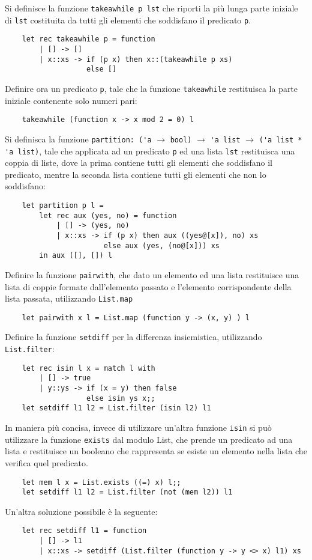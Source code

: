 \documentclass{article}
\numberwithin{equation}{subsection}
\begin{document}
Si definisce la funzione \verb|takeawhile p lst| che riporti la più lunga parte iniziale di \verb|lst| costituita da tutti gli elementi che soddisfano il predicato \verb|p|. 
\begin{verbatim}
    let rec takeawhile p = function
        | [] -> []
        | x::xs -> if (p x) then x::(takeawhile p xs)
                   else []
\end{verbatim}
Definire ora un predicato \verb|p|, tale che la funzione \verb|takeawhile| restituisca la parte iniziale contenente solo numeri pari:
\begin{verbatim}
    takeawhile (function x -> x mod 2 = 0) l    
\end{verbatim}

Si definisca la funzione \verb|partition: ('a| $\rightarrow$ \verb|bool)| $\rightarrow$ \verb|'a list| $\rightarrow$ \verb|('a list * 'a list)|, tale che applicata ad un predicato \verb|p| ed una lista \verb|lst| restituisca una coppia di liste, dove la prima contiene tutti gli elementi che soddisfano il predicato, mentre la seconda lista contiene tutti gli elementi che non lo soddisfano:
\begin{verbatim}
    let partition p l =
        let rec aux (yes, no) = function
            | [] -> (yes, no)
            | x::xs -> if (p x) then aux ((yes@[x]), no) xs
                       else aux (yes, (no@[x])) xs
        in aux ([], []) l    
\end{verbatim}

Definire la funzione \verb|pairwith|, che dato un elemento ed una lista restituisce una lista di coppie formate dall'elemento passato e l'elemento corrispondente della lista passata, utilizzando \verb|List.map|
\begin{verbatim}
    let pairwith x l = List.map (function y -> (x, y) ) l
\end{verbatim}

Definire la funzione \verb|setdiff| per la differenza insiemistica, utilizzando \verb|List.filter|:
\begin{verbatim}
    let rec isin l x = match l with
        | [] -> true
        | y::ys -> if (x = y) then false
                   else isin ys x;;
    let setdiff l1 l2 = List.filter (isin l2) l1
\end{verbatim}
In maniera più concisa, invece di utilizzare un'altra funzione \verb|isin| si può utilizzare la funzione \verb|exists| dal modulo List, che prende un predicato ad una lista e restituisce un booleano che rappresenta se esiste un elemento nella lista che verifica quel predicato. 
\begin{verbatim}
    let mem l x = List.exists ((=) x) l;;
    let setdiff l1 l2 = List.filter (not (mem l2)) l1
\end{verbatim}

Un'altra soluzione possibile è la seguente:
\begin{verbatim}
    let rec setdiff l1 = function
        | [] -> l1
        | x::xs -> setdiff (List.filter (function y -> y <> x) l1) xs    
\end{verbatim}

\clearpage
\end{document}
